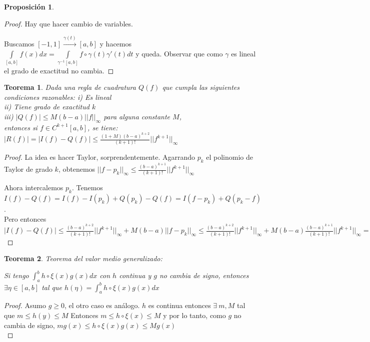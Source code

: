 \documentclass[10pt,a4paper,final]{report}
\newtheorem{theorem}{Teorema}
\newtheorem{proposition}{Proposición}
\begin{document}
{\begin{proposition}
\end{proposition}

\begin{proof}
	Hay que hacer cambio de variables.
	
	Buscamos $[-1,1] \overset{\gamma(t)}{\rightarrow} [a,b]$ y hacemos $\underset{[a,b]}{\int} f(x) dx = \underset{\gamma^{-1}[a,b]}{\int} f\circ \gamma(t) \gamma'(t) dt$ y queda. Observar que como $\gamma$ es lineal el grado de exactitud no cambia.
\end{proof}

\begin{theorem}
	 Dada una regla de cuadratura $Q(f)$ que cumpla las siguientes condiciones razonables:
	 i) Es lineal\\
	 ii) Tiene grado de exactitud $k$\\
	 iii) $|Q(f)| \leq M (b-a) ||f||_\infty$ para alguna constante $M$,\\
	 
	 entonces si $f\in C^{k+1}[a,b]$, se tiene:\\
	 $|R(f)|=|I(f)-Q(f)| \leq \frac{(1+M) (b-a)^{k+2}}{(k+1)!} ||f^{k+1}||_\infty$
\end{theorem}

\begin{proof}
	La idea es hacer Taylor, sorprendentemente. Agarrando $p_k$ el polinomio de Taylor de grado $k$, obtenemos $||f-p_k||_\infty \leq \frac{(b-a)^{k+1}}{(k+1)!} ||f^{k+1}||_\infty$
	
	Ahora intercalemos $p_k$. Tenemos $I(f)-Q(f) = I(f) - I(p_k) + Q(p_k) - Q(f) = I(f-p_k) + Q(p_k - f)$.\\
	
	Pero entonces $|I(f)-Q(f)|\leq \frac{(b-a)^{k+2}}{(k+1)!} ||f^{k+1}||_\infty + M(b-a) ||f-p_k||_\infty \leq \frac{(b-a)^{k+2}}{(k+1)!} ||f^{k+1}||_\infty + M(b-a)  \frac{(b-a)^{k+1}}{(k+1)!} ||f^{k+1}||_\infty = (M+1) \frac{(b-a)^{k+2}}{(k+1)!} ||f^{k+1}||_\infty$
\end{proof}

\begin{theorem}
	Teorema del valor medio generalizado:
	
	Si tengo $\int_a^b h\circ\xi(x) g(x) dx$ con $h$ continua y $g$ no cambia de signo, entonces $\exists \eta \in [a,b]$ tal que 
	$h(\eta)=\int_a^b h\circ\xi(x) g(x) dx$
\end{theorem}

\begin{proof}
	Asumo $g\geq 0$, el otro caso es análogo.
	$h$ es continua entonces $\exists\ m,M$ tal que $m\leq h(y)\leq M$ Entonces $m\leq h\circ \xi(x) \leq M$ y por lo tanto, como $g$ no cambia de signo, $m g(x)\leq h\circ \xi(x) g(x)\leq M g(x)$\\
	

\end{proof}}
\end{document}
